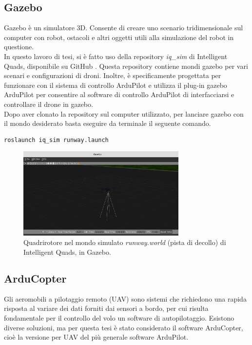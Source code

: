 \subsection{Gazebo}
Gazebo è un simulatore 3D. Consente di creare uno scenario tridimensionale sul computer con robot, ostacoli e altri oggetti utili alla simulazione del robot in questione.\\

In questo lavoro di tesi, si è fatto uso della repository \emph{iq\_sim} di Intelligent Quads, disponibile su GitHub \cite{iqSIM}. Questa repository contiene mondi gazebo per vari scenari e configurazioni di droni. Inoltre, è specificamente progettata per funzionare con il sistema di controllo ArduPilot e utilizza il plug-in gazebo ArduPilot per consentire al software di controllo ArduPilot di interfacciarsi e controllare il drone in gazebo.\\

Dopo aver clonato la repository sul computer utilizzato, per lanciare gazebo con il mondo desiderato basta eseguire da terminale il seguente comando.\\

\begin{lstlisting}[language=bash, numbers=none]
  roslaunch iq_sim runway.launch
\end{lstlisting}

\begin{figure}[H]
	\centering
	\includegraphics[width=0.75\textwidth]{gfx/ROS/gazebo_new}
	\caption[Quadrirotore nel mondo simulato.]{Quadrirotore nel mondo simulato \emph{runway.world} (pista di decollo) di Intelligent Quads, in Gazebo.}
	\label{fig:gazebo}
\end{figure}

\subsection{ArduCopter}
Gli aeromobili a pilotaggio remoto (\acs{UAV}) sono sistemi che richiedono una rapida risposta al variare dei dati forniti dai sensori a bordo, per cui risulta fondamentale per il controllo del volo un software di autopilotaggio. Esistono diverse soluzioni, ma per questa tesi è stato considerato il software ArduCopter, cioè la versione per \acs{UAV} del più generale software ArduPilot.\\

